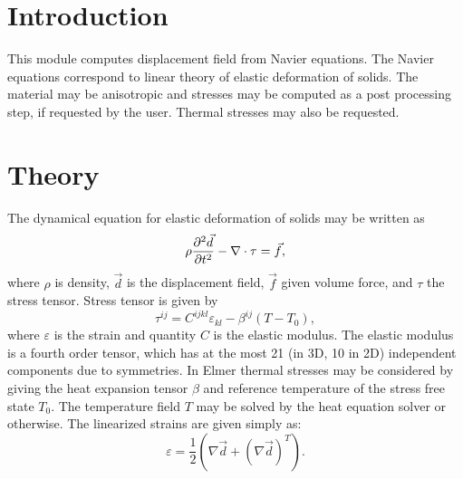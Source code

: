 

\begin{versiona}

\section{Introduction}

This module computes displacement field from Navier equations. The Navier equations
correspond to linear theory of elastic deformation of solids. The material may
be anisotropic and stresses may be computed as a post processing step, if
requested by the user. Thermal stresses may also be requested.

\section{Theory}

The dynamical equation for elastic deformation of solids may be written as
\begin{equation}
\rho\frac{\partial^2 \Vec{d}}{\partial t^2} - \nabla\cdot {\bf \tau} = \Vec{f},
\end{equation}
where $\rho$ is density, $\Vec{d}$ is the displacement field, $\Vec{f}$ given volume force, and
$\tau$ the stress tensor.
Stress tensor is given by
\begin{equation}
\tau^{ij} = C^{ijkl}\varepsilon_{kl} - \beta^{ij}(T-T_0),
\end{equation}
where $\varepsilon$ is the strain and quantity $C$ is the elastic modulus.
The elastic modulus is a fourth order tensor, which has at the most 21 (in 3D,
10 in 2D) independent components due to symmetries.
In Elmer thermal stresses may be considered by giving
the heat expansion tensor $\beta$ and reference temperature of the stress
free state $T_0$. The temperature field
$T$ may be solved by the heat equation solver or otherwise.
The linearized strains are given simply as:
\begin{equation}
\varepsilon = \frac{1}{2}(\nabla{\Vec{d}} + (\nabla{\Vec{d}})^T).
\end{equation}


\end{versiona}
